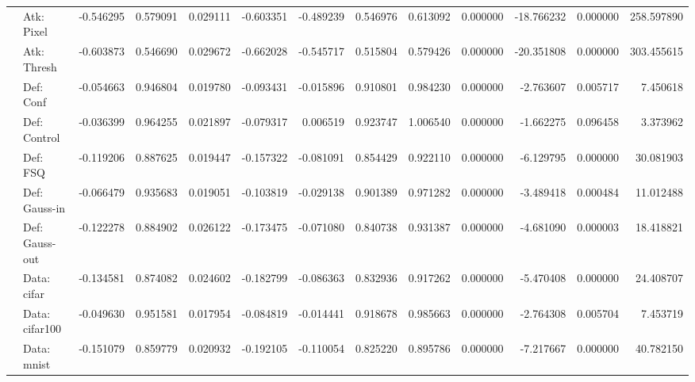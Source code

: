 \begin{table}[htbp]
\begin{tabular}{llrrrrrrrrrrr}
 & Atk: Pixel & -0.546295 & 0.579091 & 0.029111 & -0.603351 & -0.489239 & 0.546976 & 0.613092 & 0.000000 & -18.766232 & 0.000000 & 258.597890 \\
 & Atk: Thresh & -0.603873 & 0.546690 & 0.029672 & -0.662028 & -0.545717 & 0.515804 & 0.579426 & 0.000000 & -20.351808 & 0.000000 & 303.455615 \\
 & Def: Conf & -0.054663 & 0.946804 & 0.019780 & -0.093431 & -0.015896 & 0.910801 & 0.984230 & 0.000000 & -2.763607 & 0.005717 & 7.450618 \\
 & Def: Control & -0.036399 & 0.964255 & 0.021897 & -0.079317 & 0.006519 & 0.923747 & 1.006540 & 0.000000 & -1.662275 & 0.096458 & 3.373962 \\
 & Def: FSQ & -0.119206 & 0.887625 & 0.019447 & -0.157322 & -0.081091 & 0.854429 & 0.922110 & 0.000000 & -6.129795 & 0.000000 & 30.081903 \\
 & Def: Gauss-in & -0.066479 & 0.935683 & 0.019051 & -0.103819 & -0.029138 & 0.901389 & 0.971282 & 0.000000 & -3.489418 & 0.000484 & 11.012488 \\
 & Def: Gauss-out & -0.122278 & 0.884902 & 0.026122 & -0.173475 & -0.071080 & 0.840738 & 0.931387 & 0.000000 & -4.681090 & 0.000003 & 18.418821 \\
 & Data: cifar & -0.134581 & 0.874082 & 0.024602 & -0.182799 & -0.086363 & 0.832936 & 0.917262 & 0.000000 & -5.470408 & 0.000000 & 24.408707 \\
 & Data: cifar100 & -0.049630 & 0.951581 & 0.017954 & -0.084819 & -0.014441 & 0.918678 & 0.985663 & 0.000000 & -2.764308 & 0.005704 & 7.453719 \\
 & Data: mnist & -0.151079 & 0.859779 & 0.020932 & -0.192105 & -0.110054 & 0.825220 & 0.895786 & 0.000000 & -7.217667 & 0.000000 & 40.782150 \\
\cline{1-13}
\bottomrule
\end{tabular}
\end{table}
